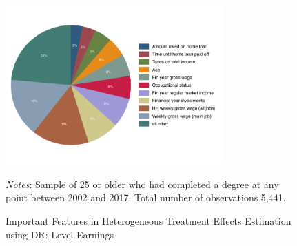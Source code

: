 \documentclass[12pt, a4paper]{article}
\begin{document}
\begin{figure}[H]
\centering
\caption{Important Features in Heterogeneous Treatment Effects Estimation using DR: Level Earnings}
\vspace{0.5cm}
  \label{fig:featgbrDR}
    \includegraphics[width=0.75\textwidth]{_figures/DR_influenceP_GBR_le_100.pdf}
\parbox{1\textwidth}{\footnotesize{\textit{Notes}: Sample of 25 or older who had completed a degree at any point between 2002 and 2017. Total number of observations 5,441.}}
\end{figure}







%
%
\end{document}
